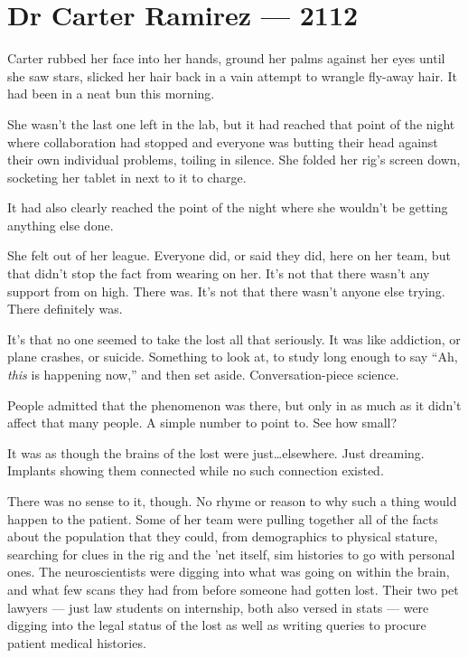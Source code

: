 \hypertarget{dr-carter-ramirez-2112}{%
\chapter*{Dr Carter Ramirez — 2112}\label{dr-carter-ramirez-2112}}

Carter rubbed her face into her hands, ground her palms against her eyes until she saw stars, slicked her hair back in a vain attempt to wrangle fly-away hair. It had been in a neat bun this morning.

She wasn't the last one left in the lab, but it had reached that point of the night where collaboration had stopped and everyone was butting their head against their own individual problems, toiling in silence. She folded her rig's screen down, socketing her tablet in next to it to charge.

It had also clearly reached the point of the night where she wouldn't be getting anything else done.

She felt out of her league. Everyone did, or said they did, here on her team, but that didn't stop the fact from wearing on her. It's not that there wasn't any support from on high. There was. It's not that there wasn't anyone else trying. There definitely was.

It's that no one seemed to take the lost all that seriously. It was like addiction, or plane crashes, or suicide. Something to look at, to study long enough to say ``Ah, \emph{this} is happening now,'' and then set aside. Conversation-piece science.

People admitted that the phenomenon was there, but only in as much as it didn't affect that many people. A simple number to point to. See how small?

It was as though the brains of the lost were just\ldots{}elsewhere. Just dreaming. Implants showing them connected while no such connection existed.

There was no sense to it, though. No rhyme or reason to why such a thing would happen to the patient. Some of her team were pulling together all of the facts about the population that they could, from demographics to physical stature, searching for clues in the rig and the 'net itself, sim histories to go with personal ones. The neuroscientists were digging into what was going on within the brain, and what few scans they had from before someone had gotten lost. Their two pet lawyers — just law students on internship, both also versed in stats — were digging into the legal status of the lost as well as writing queries to procure patient medical histories.

